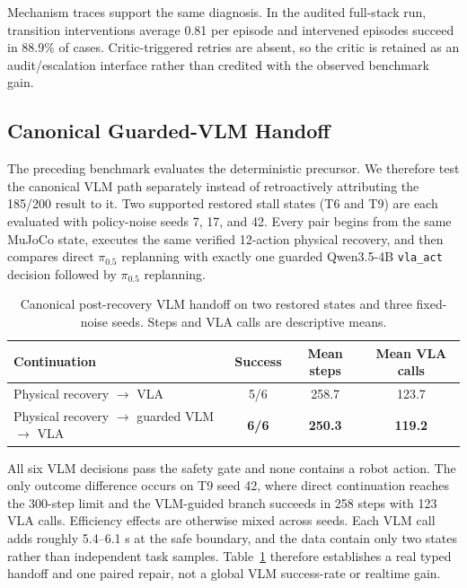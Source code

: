 \documentclass[runningheads]{waica}
\newcommand{\pizero}{$\pi_{0.5}$}
\begin{document}
Mechanism traces support the same diagnosis. In the audited full-stack run,
transition interventions average 0.81 per episode and intervened episodes
succeed in 88.9\% of cases. Critic-triggered retries are absent, so the critic
is retained as an audit/escalation interface rather than credited with the
observed benchmark gain.

\subsection{Canonical Guarded-VLM Handoff}

The preceding benchmark evaluates the deterministic precursor. We therefore
test the canonical VLM path separately instead of retroactively attributing the
185/200 result to it. Two supported restored stall states (T6 and T9) are each
evaluated with policy-noise seeds 7, 17, and 42. Every pair begins from the same
MuJoCo state, executes the same verified 12-action physical recovery, and then
compares direct \pizero{} replanning with exactly one guarded Qwen3.5-4B
\texttt{vla\_act} decision followed by \pizero{} replanning.

\begin{table}
\caption{Canonical post-recovery VLM handoff on two restored states and three
fixed-noise seeds. Steps and VLA calls are descriptive means.}
\label{tab:vlm_pair}
\centering
\small
\begin{tabular}{lccc}
\toprule
Continuation & Success & Mean steps & Mean VLA calls \\
\midrule
Physical recovery $\rightarrow$ VLA & 5/6 & 258.7 & 123.7 \\
Physical recovery $\rightarrow$ guarded VLM $\rightarrow$ VLA & \textbf{6/6} & \textbf{250.3} & \textbf{119.2} \\
\bottomrule
\end{tabular}
\end{table}

All six VLM decisions pass the safety gate and none contains a robot action.
The only outcome difference occurs on T9 seed 42, where direct continuation
reaches the 300-step limit and the VLM-guided branch succeeds in 258 steps with
123 VLA calls. Efficiency effects are otherwise mixed across seeds. Each VLM
call adds roughly 5.4--6.1 s at the safe boundary, and the data contain only
two states rather than independent task samples. Table~\ref{tab:vlm_pair}
therefore establishes a real typed handoff and one paired repair, not a global
VLM success-rate or realtime gain.
\end{document}
